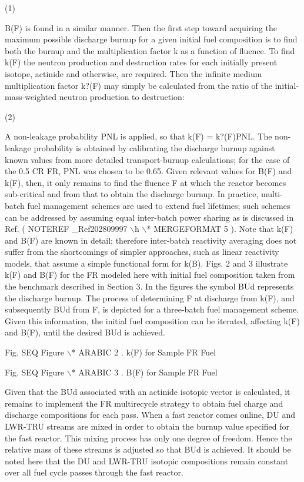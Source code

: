                            (1)

	B(F) is found in a similar manner.  Then the first step toward
acquiring the maximum possible discharge burnup for a given initial fuel
composition is to find both the burnup and the multiplication factor k
as a function of fluence.  To find k(F) the neutron production and
destruction rates for each initially present isotope, actinide and
otherwise, are required.  Then the infinite medium multiplication factor
k?(F) may simply be calculated from the ratio of the
initial-mass-weighted neutron production to destruction:

                      (2)

A non-leakage probability PNL is applied, so that k(F) = k?(F)PNL.  The
non-leakage probability is obtained by calibrating the discharge burnup
against known values from more detailed transport-burnup calculations;
for the case of the 0.5 CR FR, PNL was chosen to be 0.65.  Given
relevant values for B(F) and k(F), then, it only remains to find the
fluence F at which the reactor becomes sub-critical and from that to
obtain the discharge burnup.  In practice, multi-batch fuel management
schemes are used to extend fuel lifetimes; such schemes can be addressed
by assuming equal inter-batch power sharing as is discussed in Ref. ( 
NOTEREF \_Ref202809997 $\backslash$h  $\backslash$* MERGEFORMAT  5 ). 
Note that k(F) and B(F) are known in detail; therefore inter-batch
reactivity averaging does not suffer from the shortcomings of simpler
approaches, such as linear reactivity models, that assume a simple
functional form for k(B).  Figs. 2 and 3 illustrate k(F) and B(F) for
the FR modeled here with initial fuel composition taken from the
benchmark described in Section 3.  In the figures the symbol BUd
represents the discharge burnup.  The process of determining F at
discharge from k(F), and subsequently BUd from F, is depicted for a
three-batch fuel management scheme.  Given this information, the initial
fuel composition can be iterated, affecting k(F) and B(F), until the
desired BUd is achieved.

Fig.   SEQ Figure $\backslash$* ARABIC  2 .  k(F) for Sample FR Fuel

Fig.   SEQ Figure $\backslash$* ARABIC  3 .  B(F) for Sample FR Fuel

	

	Given that the BUd associated with an actinide isotopic vector is
calculated, it remains to implement the FR multirecycle strategy to
obtain fuel charge and discharge compositions for each pass.  When a
fast reactor comes online, DU and LWR-TRU streams are mixed in order to
obtain the burnup value specified for the fast reactor.  This mixing
process has only one degree of freedom.  Hence the relative mass of
these streams is adjusted so that BUd is achieved.  It should be noted
here that the DU and LWR-TRU isotopic compositions remain constant over
all fuel cycle passes through the fast reactor.  

